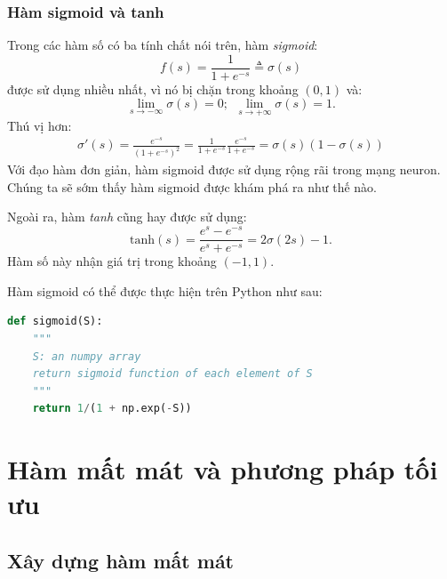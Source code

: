\subsubsection{Hàm sigmoid và tanh}

Trong các hàm số có ba tính chất nói trên, hàm \textit{sigmoid}:
\begin{equation}
f(s) = \frac{1}{1 + e^{-s}} \triangleq \sigma(s)
\end{equation}
được sử dụng nhiều nhất, vì nó bị chặn trong khoảng $(0, 1)$ và:
\begin{equation}
\lim_{s \rightarrow -\infty}\sigma(s) = 0; ~~ \lim_{s \rightarrow +\infty}\sigma(s) = 1.
\end{equation}
Thú vị hơn:
\begin{eqnarray}
\sigma'(s) = \frac{e^{-s}}{(1 + e^{-s})^2}
= \frac{1}{1 + e^{-s}} \frac{e^{-s}}{1 + e^{-s}}
= \sigma(s)(1 - \sigma(s))
\end{eqnarray}
Với đạo hàm đơn giản, hàm sigmoid được sử dụng rộng rãi trong mạng neuron. {Chúng ta sẽ sớm thấy hàm sigmoid được khám phá ra như thế nào.}

Ngoài ra, hàm \textit{tanh} cũng hay được sử dụng:
\begin{equation}
\displaystyle
\text{tanh}(s) = \frac{e^{s} - e^{-s}}{e^s + e^{-s}} = 2\sigma(2s) - 1.
\end{equation}
Hàm số này nhận giá trị trong khoảng $(-1, 1)$.

Hàm sigmoid có thể được thực hiện trên Python như sau:
\begin{lstlisting}[language=Python]
def sigmoid(S):
    """
    S: an numpy array
    return sigmoid function of each element of S
    """
    return 1/(1 + np.exp(-S))
\end{lstlisting}





\section{Hàm mất mát và phương pháp tối ưu}


\subsection{Xây dựng hàm mất mát}

